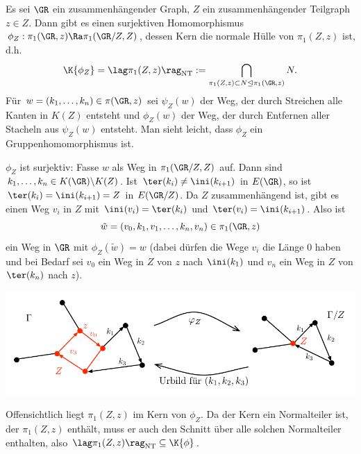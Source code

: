 \BEM Es sei $\GR$ ein zusammenhängender Graph, $Z$ ein zusammenhängender 
Teilgraph $z\in Z$.
Dann gibt es einen surjektiven Homomorphismus
$\phi_Z:\pi_1(\GR,z)\Ra\pi_1(\GR/Z,Z)$, dessen Kern die
normale Hülle von $\pi_1(Z,z)$ ist, d.h.
\[
\K{\phi_Z}=\lag\pi_1(Z,z)\rag_{\mathrm{NT}}:=
\bigcap_{\pi_1(Z,z)\subset N \unlhd \pi_1(\GR,z)} N.
\]
\bew Für $w=(k_1,\ldots,k_n)\in\pi(\GR,z)$ sei
$\psi_Z(w)$ der Weg, der durch Streichen alle Kanten in $K(Z)$
entsteht und $\phi_Z(w)$ der Weg, der durch Entfernen aller Stacheln
aus $\psi_Z(w)$ entsteht. Man sieht leicht, dass $\phi_Z$ ein
Gruppenhomomorphismus ist.

$\phi_Z$ ist surjektiv: Fasse $w$ als Weg in $\pi_1(\GR/Z,Z)$ auf.
Dann sind $k_1,\ldots,k_n\in K(\GR)\backslash K(Z)$.
Ist $\ter(k_i)\neq \ini(k_{i+1})$ in $E(\GR)$, so ist
$\ter(k_i)=\ini(k_{i+1})=Z$ in $E(\GR/Z)$.
Da $Z$ zusammenhängend ist, gibt es einen Weg $v_i$ in $Z$ mit
$\ini(v_i)=\ter(k_i)$ und $\ter(v_i)=\ini(k_{i+1})$.
Also ist
\[
\tilde{w}=
(v_0,k_1,v_1,\ldots,k_n,v_n) \in \pi_1(\GR,z)
\]
ein Weg in $\GR$ mit $\phi_Z(\tilde{w})=w$
(dabei dürfen die Wege $v_i$ die Länge $0$ haben und bei Bedarf
sei $v_0$ ein Weg in $Z$ von $z$ nach $\ini(k_1)$ und $v_n$ ein
Weg in $Z$ von $\ter(k_n)$ nach $z$).
\begin{center}
	\includegraphics{grugraImages/phiZ}
\end{center}
Offensichtlich liegt $\pi_1(Z,z)$ im Kern von $\phi_Z$. Da der Kern
ein Normalteiler ist, der $\pi_1(Z,z)$ enthält, muss er auch
den Schnitt über alle solchen Normalteiler enthalten,
also $\lag \pi_1(Z,z)\rag_{\mathrm{NT}}\subseteq \K{\phi}$.

